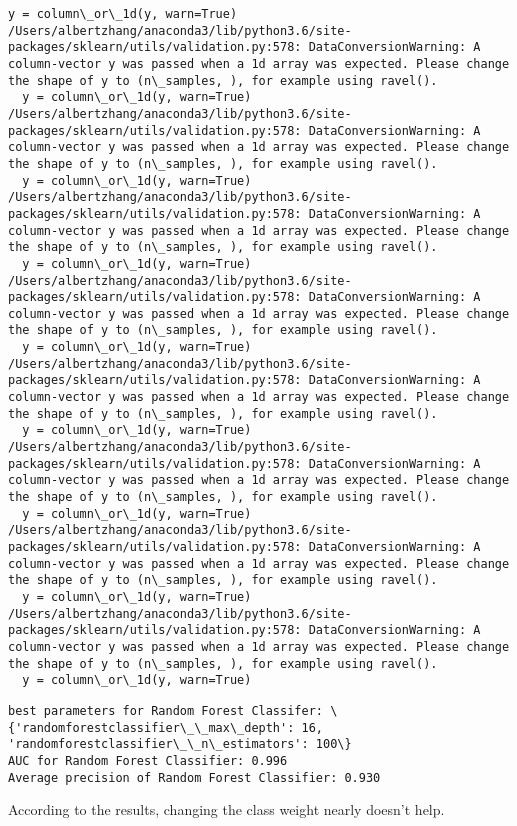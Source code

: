 \documentclass[11pt]{article}
\begin{document}
\begin{Verbatim}[commandchars=\\\{\}]
  y = column\_or\_1d(y, warn=True)
/Users/albertzhang/anaconda3/lib/python3.6/site-packages/sklearn/utils/validation.py:578: DataConversionWarning: A column-vector y was passed when a 1d array was expected. Please change the shape of y to (n\_samples, ), for example using ravel().
  y = column\_or\_1d(y, warn=True)
/Users/albertzhang/anaconda3/lib/python3.6/site-packages/sklearn/utils/validation.py:578: DataConversionWarning: A column-vector y was passed when a 1d array was expected. Please change the shape of y to (n\_samples, ), for example using ravel().
  y = column\_or\_1d(y, warn=True)
/Users/albertzhang/anaconda3/lib/python3.6/site-packages/sklearn/utils/validation.py:578: DataConversionWarning: A column-vector y was passed when a 1d array was expected. Please change the shape of y to (n\_samples, ), for example using ravel().
  y = column\_or\_1d(y, warn=True)
/Users/albertzhang/anaconda3/lib/python3.6/site-packages/sklearn/utils/validation.py:578: DataConversionWarning: A column-vector y was passed when a 1d array was expected. Please change the shape of y to (n\_samples, ), for example using ravel().
  y = column\_or\_1d(y, warn=True)
/Users/albertzhang/anaconda3/lib/python3.6/site-packages/sklearn/utils/validation.py:578: DataConversionWarning: A column-vector y was passed when a 1d array was expected. Please change the shape of y to (n\_samples, ), for example using ravel().
  y = column\_or\_1d(y, warn=True)
/Users/albertzhang/anaconda3/lib/python3.6/site-packages/sklearn/utils/validation.py:578: DataConversionWarning: A column-vector y was passed when a 1d array was expected. Please change the shape of y to (n\_samples, ), for example using ravel().
  y = column\_or\_1d(y, warn=True)
/Users/albertzhang/anaconda3/lib/python3.6/site-packages/sklearn/utils/validation.py:578: DataConversionWarning: A column-vector y was passed when a 1d array was expected. Please change the shape of y to (n\_samples, ), for example using ravel().
  y = column\_or\_1d(y, warn=True)
/Users/albertzhang/anaconda3/lib/python3.6/site-packages/sklearn/utils/validation.py:578: DataConversionWarning: A column-vector y was passed when a 1d array was expected. Please change the shape of y to (n\_samples, ), for example using ravel().
  y = column\_or\_1d(y, warn=True)

    \end{Verbatim}

    \begin{Verbatim}[commandchars=\\\{\}]
best parameters for Random Forest Classifer: \{'randomforestclassifier\_\_max\_depth': 16, 'randomforestclassifier\_\_n\_estimators': 100\}
AUC for Random Forest Classifier: 0.996
Average precision of Random Forest Classifier: 0.930

    \end{Verbatim}

    According to the results, changing the class weight nearly doesn't help.


    
    
    
    
\end{document}
